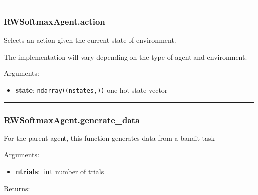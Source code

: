 \begin{center}\rule{0.5\linewidth}{\linethickness}\end{center}

\subsubsection{RWSoftmaxAgent.action}\label{rwsoftmaxagent.action}

\begin{Shaded}
\begin{Highlighting}[]
\end{Highlighting}
\end{Shaded}

Selects an action given the current state of environment.

The implementation will vary depending on the type of agent and
environment.

Arguments:

\begin{itemize}
\tightlist
\item
  \textbf{state}: \texttt{ndarray((nstates,))} one-hot state vector
\end{itemize}

\begin{center}\rule{0.5\linewidth}{\linethickness}\end{center}

\subsubsection{RWSoftmaxAgent.generate\_data}\label{rwsoftmaxagent.generate_data}

\begin{Shaded}
\begin{Highlighting}[]
\end{Highlighting}
\end{Shaded}

For the parent agent, this function generates data from a bandit task

Arguments:

\begin{itemize}
\tightlist
\item
  \textbf{ntrials}: \texttt{int} number of trials
\end{itemize}

Returns:

